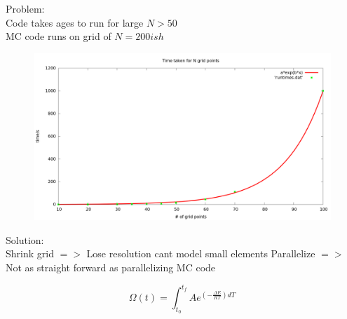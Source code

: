 \documentclass{beamer}
\begin{document}
\begin{frame}
Problem:\\
Code takes ages to run for large $N>50$ \\
MC code runs on grid of $N=200ish$
\begin{figure}
\centering
\includegraphics[scale=.17]{time.png}

\end{figure}
\end{frame}

\begin{frame}
Solution:\\
Shrink grid $=>$ Lose resolution cant model small elements
Parallelize $=>$ Not as straight forward as parallelizing MC code


\begin{equation}
\Omega(t) = \int_{t_0}^{t_f} A e^{(- \tfrac{\Delta E}{RT}) dT}
\end{equation}

\hskip 1cm
\end{frame}
\end{document}
